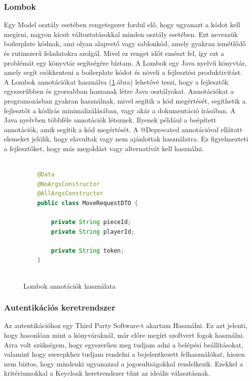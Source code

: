\documentclass[a4paper,twoside]{article}
\begin{document}
\subsubsection{Lombok}
Egy Model osztály esetében rengetegszer fordul elő, hogy ugyanazt a kódot kell megírni, nagyon kicsit változtatásokkal minden osztály esetében. Ezt nevezzük boilerplate kódnak, ami olyan alapvető vagy sablonkód, amely gyakran ismétlődő és rutinszerű feladatokra szolgál. Mivel ez renget időt emészt fel, így ezt a problémát egy könyvtár segítségére bíztam. 
A Lombok \cite{lombok}  egy Java nyelvű könyvtár, amely
segít csökkenteni a boilerplate kódot és növeli a fejlesztési produktivitást.  A Lombok annotációkat használva (\ref{lombok}.ábra) lehetővé teszi, hogy a fejlesztők egyszerűbben és gyorsabban hozzanak létre Java osztályokat. Annotációkat a programozásban gyakran használnak, mivel segítik a kód megértését, segíthetik a fejlesztőt a kódírás minimalizálásában, vagy akár a dokumentáció írásában. A Java nyelvben többféle annotációk léteznek. Ilyenek például a beépített annotációk, amik segítik a kód
megértését. A @Deprecated annotációval ellátott elemeket jelölik, hogy elavultak vagy nem ajánlottak használatra. Ez figyelmezteti a fejlesztőket, hogy más megoldást vagy alternatívát kell használni.

\begin{figure}[h]
	\caption{Lombok annotációk használata}
	\centering
	\begin{lstlisting}[language=java]
		
	@Data
	@NoArgsConstructor
	@AllArgsConstructor
	public class MoveRequestDTO {
		
		private String pieceId;
		private String playerId;
		
		private String token;
	}
		
	\end{lstlisting}
	\label{lombok}
\end{figure} 

\subsubsection{Autentikációs keretrendszer}
Az autentikációhoz egy Third Party Software-t akartam Használni. Ez azt jelenti, hogy hasonlóan mint a könyváraknál, már előre megírt szoftvert fogok használni. Arra volt szükségem, hogy egyszerűen meg tudjam adni a belépési beállításokat, valamint hogy szerepkhez tudjam rendelni a bejelentkezett felhasználókat, hiszen nem biztos, hogy mindenki ugyanazzal a jogosultságokkal rendelkezik. Ezekkel a kritériumokkal a Keycloak\cite{keycloak} keretrendszer tűnt az ideális választásnak. 
\end{document}
